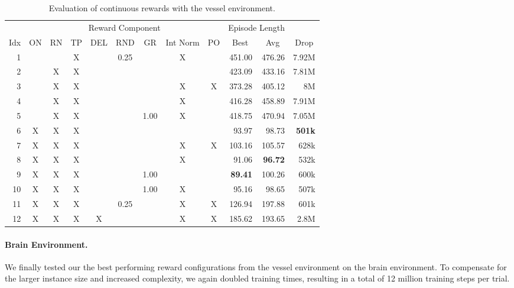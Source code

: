 \begin{table}[htp]
    \begin{center}
        \begin{tabular}{rccccccccrrr}
            \toprule
             & \multicolumn{8}{c}{Reward Component} & \multicolumn{2}{c}{Episode Length} & \\
            \cmidrule(lr){2-9}\cmidrule(lr){10-11}
            \multicolumn{1}{c}{Idx} & \multicolumn{1}{c}{ON} & \multicolumn{1}{c}{RN} & \multicolumn{1}{c}{TP} & \multicolumn{1}{c}{DEL} & \multicolumn{1}{c}{RND} & \multicolumn{1}{c}{GR} & \multicolumn{1}{c}{Int Norm} & \multicolumn{1}{c}{PO} & \multicolumn{1}{c}{Best} & \multicolumn{1}{c}{Avg} & \multicolumn{1}{c}{Drop}\\
            \midrule
            1 &  &  & X &  & 0.25 &  & X &  & 451.00 & 476.26 & 7.92M \\
            2 &  & X & X &  &  &  &  &  & 423.09 & 433.16 & 7.81M \\
            3 &  & X & X &  &  &  & X & X & 373.28 & 405.12 & 8M \\
            4 &  & X & X &  &  &  & X &  & 416.28 & 458.89 & 7.91M \\
            5 &  & X & X &  &  & 1.00 & X &  & 418.75 & 470.94 & 7.05M \\
            6 & X & X & X &  &  &  &  &  & 93.97 & 98.73 & \textbf{501k} \\
            7 & X & X & X &  &  &  & X & X & 103.16 & 105.57 & 628k \\
            8 & X & X & X &  &  &  & X &  & 91.06 & \textbf{96.72} & 532k \\
            9 & X & X & X &  &  & 1.00 &  &  & \textbf{89.41} & 100.26 & 600k \\
            10 & X & X & X &  &  & 1.00 & X &  & 95.16 & 98.65 & 507k \\
            11 & X & X & X &  & 0.25 &  & X & X & 126.94 & 197.88 & 601k \\
            12 & X & X & X & X &  &  & X & X & 185.62 & 193.65 & 2.8M \\
            \bottomrule
        \end{tabular}
    \end{center}
    \caption[Evaluation of Continuous Reward with the Vessel Environment]{Evaluation of continuous rewards with the vessel environment.} \label{tab:VesselMaze02/Reward/Continuous}
\end{table}

\paragraph{Brain Environment.} We finally tested our the best performing reward configurations from the vessel environment on the brain environment. To compensate for the larger instance size and increased complexity, we again doubled training times, resulting in a total of 12 million training steps per trial. 

